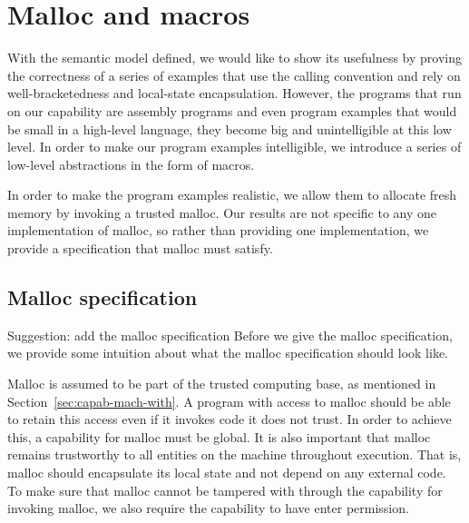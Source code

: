 \documentclass[format=acmsmall, review=false, screen=true]{acmart}
\renewcommand{\sectionname}{Section}
\newenvironment{toplas}
    {\color{OliveGreen}
          
    }{}
\newcommand{\itoplassug}[1]
    {{\color{Blue} #1}}
\begin{document}
\begin{toplas}
  \section{Malloc and macros}
  \label{sec:malloc-and-macros}
With the semantic model defined, we would like to show its usefulness by proving
the correctness of a series of examples that use the calling convention and rely
on well-bracketedness and local-state encapsulation. However, the programs that
run on our capability are assembly programs and even program examples that would
be small in a high-level language, they become big and unintelligible at this
low level. In order to make our program examples intelligible, we introduce a
series of low-level abstractions in the form of macros.

In order to make the program examples realistic, we allow them to allocate fresh
memory by invoking a trusted malloc. Our results are not specific to
any one implementation of malloc, so rather than providing one implementation,
we provide a specification that malloc must satisfy.

\subsection{Malloc specification}
  \itoplassug{Suggestion: add the malloc specification}
Before we give the malloc specification, we provide some intuition about what
the malloc specification should look like.

Malloc is assumed to be part of the trusted computing base, as mentioned in
\sectionname~\ref{sec:capab-mach-with}. A program with access to malloc should
be able to retain this access even if it invokes code it does not trust. In
order to achieve this, a capability for malloc must be global. It is also
important that malloc remains trustworthy to all entities on the machine
throughout execution. That is, malloc should encapsulate its local state and
not depend on any external code. To make sure that malloc cannot be tampered
with through the capability for invoking malloc, we also require the capability
to have enter permission. 


\end{toplas}
\end{document}
